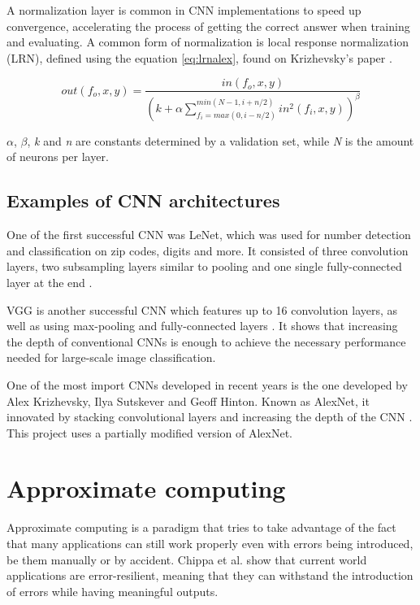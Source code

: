 A normalization layer is common in CNN implementations to speed up convergence, accelerating
the process of getting the correct answer when training and evaluating.
A common form of normalization is local response normalization (LRN), defined
using the equation \ref{eq:lrnalex}, found on Krizhevsky's paper \cite{krizhevsky2012imagenet}.

\begin{equation} \label{eq:lrnalex}
  out(f_o,x,y)
  =
  \frac{in(f_o,x,y)}
  {\left(k+\alpha\sum_{f_i=max(0,i-n/2)}^{min(N-1,i+n/2)}in^2(f_i,x,y)\right)^\beta}
\end{equation}

$\alpha$, $\beta$, {\textit{k}}
and \textit{n}
are constants determined by a validation set,
while \textit{N}
is the amount of neurons per layer.

\subsection{Examples of CNN architectures}

One of the first successful CNN was LeNet, which was used for number detection
and classification on zip codes, digits and more. It consisted of three convolution
layers, two subsampling layers similar to pooling and one single fully-connected
layer at the end \cite{lecun1998gradient}.

VGG is another successful CNN which features up to 16 convolution layers, as well
as using max-pooling and fully-connected layers \cite{simonyan2014very}. It shows
that increasing the depth of conventional CNNs is enough to achieve the necessary
performance needed for large-scale image classification.

One of the most import CNNs developed in recent years is the one developed by 
Alex Krizhevsky, Ilya Sutskever and Geoff Hinton. Known as AlexNet, it innovated
by stacking convolutional layers and increasing the depth of the CNN \cite{krizhevsky2012imagenet}. 
This project uses a partially modified version of AlexNet.


\section{Approximate computing}

Approximate computing is a paradigm that tries to take advantage of the fact that
many applications can still work properly even with errors being introduced, be them
manually or by accident. Chippa et al. \cite{chippa2013analysis} show that current world
applications are error-resilient, meaning that they can withstand the introduction of errors
while having meaningful outputs.

